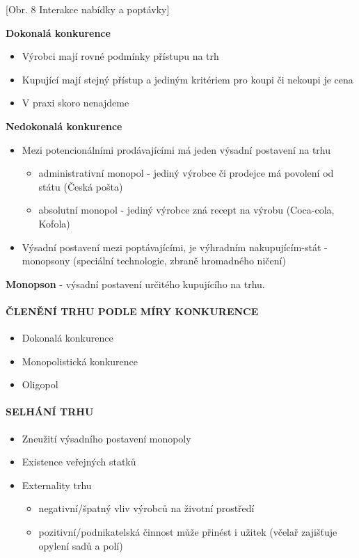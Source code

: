 \documentclass[11pt,a4paper,twoside]{book}
\begin{document}
[Obr. 8 Interakce nabídky a poptávky]

\textbf{Dokonalá konkurence}
\begin{itemize}
	\item Výrobci mají rovné podmínky přístupu na trh
	\item Kupující mají stejný přístup a jediným kritériem pro koupi či nekoupi je cena
	\item V praxi skoro nenajdeme
\end{itemize}

\textbf{Nedokonalá konkurence}
\begin{itemize}
	\item Mezi potencionálními prodávajícími má jeden výsadní postavení na trhu
	\begin{itemize}
		\item administrativní monopol - jediný výrobce či prodejce má povolení od státu (Česká pošta)
		\item absolutní monopol - jediný výrobce zná recept na výrobu (Coca-cola, Kofola)
	\end{itemize}
	\item Výsadní postavení mezi poptávajícími, je výhradním nakupujícím-stát - monopsony (speciální technologie, zbraně hromadného ničení)
\end{itemize}

\textbf{Monopson} - výsadní postavení určitého kupujícího na trhu.

\paragraph*{ČLENĚNÍ TRHU PODLE MÍRY KONKURENCE}
\begin{itemize}
	\item Dokonalá konkurence
	\item Monopolistická konkurence
	\item Oligopol
\end{itemize}

\paragraph*{SELHÁNÍ TRHU}
\begin{itemize}
	\item Zneužití výsadního postavení monopoly
	\item Existence veřejných statků
	\item Externality trhu
	\begin{itemize}
		\item negativní/špatný vliv výrobců na životní prostředí
		\item pozitivní/podnikatelská činnost může přinést i užitek (včelař zajišťuje opylení sadů a polí)
	\end{itemize}
\end{itemize}
\end{document}
